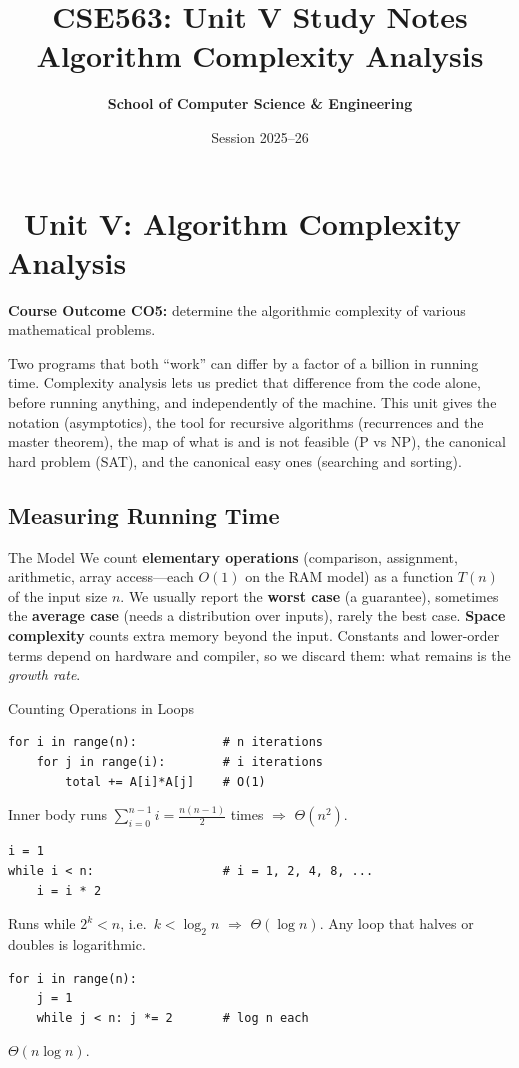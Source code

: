 \documentclass[11pt,a4paper]{article}
\title{\textbf{\color{NavyPrimary}CSE563: Unit V Study Notes}\\ \Large Algorithm Complexity Analysis}
\author{\textbf{School of Computer Science \& Engineering}}
\date{Session 2025--26}
\begin{document}
\maketitle
\tableofcontents
\newpage

\section{\faStopwatch\ Unit V: Algorithm Complexity Analysis}

\textbf{Course Outcome CO5:} determine the algorithmic complexity of various mathematical problems.

Two programs that both ``work'' can differ by a factor of a billion in running time. Complexity analysis lets us predict that difference from the code alone, before running anything, and independently of the machine. This unit gives the notation (asymptotics), the tool for recursive algorithms (recurrences and the master theorem), the map of what is and is not feasible (P vs NP), the canonical hard problem (SAT), and the canonical easy ones (searching and sorting).

\subsection{Measuring Running Time}

\begin{keyconcept}{The Model}
We count \textbf{elementary operations} (comparison, assignment, arithmetic, array access---each $O(1)$ on the RAM model) as a function $T(n)$ of the input size $n$. We usually report the \textbf{worst case} (a guarantee), sometimes the \textbf{average case} (needs a distribution over inputs), rarely the best case. \textbf{Space complexity} counts extra memory beyond the input. Constants and lower-order terms depend on hardware and compiler, so we discard them: what remains is the \emph{growth rate}.
\end{keyconcept}

\begin{worked}{Counting Operations in Loops}
\begin{lstlisting}
for i in range(n):            # n iterations
    for j in range(i):        # i iterations
        total += A[i]*A[j]    # O(1)
\end{lstlisting}
Inner body runs $\sum_{i=0}^{n-1} i = \frac{n(n-1)}{2}$ times $\Rightarrow$ $\Theta(n^2)$.

\begin{lstlisting}
i = 1
while i < n:                  # i = 1, 2, 4, 8, ...
    i = i * 2
\end{lstlisting}
Runs while $2^k < n$, i.e.\ $k < \log_2 n$ $\Rightarrow$ $\Theta(\log n)$. Any loop that halves or doubles is logarithmic.

\begin{lstlisting}
for i in range(n):
    j = 1
    while j < n: j *= 2       # log n each
\end{lstlisting}
$\Theta(n \log n)$.
\end{worked}
\end{document}
